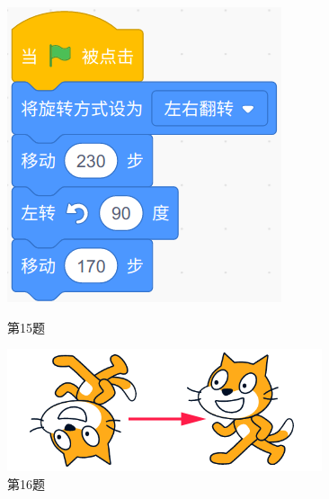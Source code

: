 \documentclass[10pt, a4paper]{article}
\begin{document}
\begin{enumerate}
        \begin{figure}[htbp]
            \centering
            \begin{minipage}[t]{.15\textwidth}
                \centering
                \includegraphics[width=\textwidth]{15.png}
                \caption*{第15题}
            \end{minipage}
            \begin{minipage}[t]{.22\textwidth}
                \centering
                \includegraphics[width=\textwidth]{16.png}
                \caption*{第16题}
            \end{minipage}
            \begin{minipage}[t]{.1\textwidth}
                \centering

\end{minipage}
\end{figure}
\end{enumerate}
\end{document}
